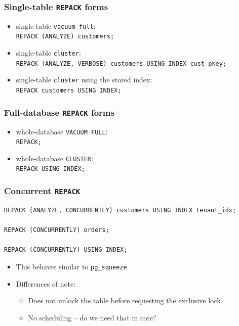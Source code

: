 \begin{frame}
  \frametitle{Single-table \texttt{REPACK} forms}
  \begin{itemize}
    \item single-table \texttt{vacuum full}: \\
      \texttt{REPACK (ANALYZE) customers;}
    \item single-table \texttt{cluster}: \\
      \texttt{REPACK (ANALYZE, VERBOSE) customers USING INDEX cust\_pkey;}
    \item single-table \texttt{cluster} using the stored index: \\
      \texttt{REPACK customers USING INDEX;}
  \end{itemize}
\end{frame}

\begin{frame}
  \frametitle{Full-database \texttt{REPACK} forms}
  \begin{itemize}
    \item whole-database \texttt{VACUUM FULL}: \\
      \texttt{REPACK;}
    \item whole-database \texttt{CLUSTER}: \\
      \texttt{REPACK USING INDEX;}
  \end{itemize}
\end{frame}

\begin{frame}[fragile]
  \frametitle{Concurrent \texttt{REPACK}}
  \begin{lstlisting}
REPACK (ANALYZE, CONCURRENTLY) customers USING INDEX tenant_idx;

REPACK (CONCURRENTLY) orders;

REPACK (CONCURRENTLY) USING INDEX;
  \end{lstlisting}
  \begin{itemize}
    \item This behaves similar to \texttt{pg\_squeeze}
    \item Differences of note:
      \begin{itemize}
	\item Does not unlock the table before requesting the exclusive lock.
	\item No scheduling -- do we need that in core?
      \end{itemize}
  \end{itemize}
\end{frame}

